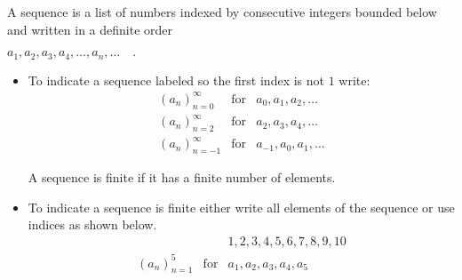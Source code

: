 \begin{frame}
\begin{definition}
A sequence is a list of numbers indexed by consecutive integers bounded below and written in a definite order

\hfil\hfil$a_1, a_2, a_3, a_4, \ldots , a_n , \ldots\quad .$
\end{definition}

\begin{itemize}
\item To indicate a sequence labeled so the first index is not $1$ write:
\[
\begin{array}{rcl}
\left(a_n\right)_{n=0}^{\infty}&\text{for}& a_0, a_1, a_2,\dots \\
\left(a_n\right)_{n=2}^{\infty}&\text{for}& a_2, a_3, a_4,\dots \\
\left(a_n\right)_{n=-1}^{\infty}&\text{for}& a_{-1}, a_0, a_1,\dots
\end{array}
\]
\begin{definition}
A sequence is finite if it has a finite number of elements.
\end{definition}
\item To indicate a sequence is finite either write all elements of the sequence or use indices as shown below.
\[
\begin{array}{rcl}
&&1,2,3,4,5,6,7,8,9,10\\
\left(a_n\right)_{n=1}^{5}&\text{for}& a_1,a_2,a_3,a_4,a_5 
\end{array}
\]
\end{itemize}


\end{frame}
